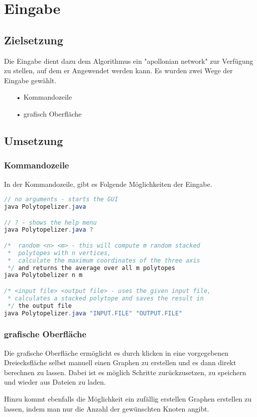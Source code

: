 \documentclass[11pt]{article}
\begin{document}
\section{Eingabe}
\subsection{Zielsetzung}
Die Eingabe dient dazu dem Algorithmus ein "apollonian network" zur Verfügung zu stellen, auf dem er Angewendet werden kann. Es wurden zwei Wege der Eingabe gewählt. 
\begin{itemize}
\item[•] Kommandozeile
\item[•] grafisch Oberfläche
\end{itemize}
\subsection{Umsetzung}
\subsubsection{Kommandozeile}
In der Kommandozeile, gibt es Folgende Möglichkeiten der Eingabe. 
\begin{lstlisting}[language=JAVA]
// no arguments - starts the GUI
java Polytopelizer.java

// ? - shows the help menu
java Polytopelizer.java ?

/*  random <n> <m> - this will compute m random stacked 
 *  polytopes with n vertices,
 *  calculate the maximum coordinates of the three axis 
 */ and returns the average over all m polytopes
java Polytobelizer n m

/* <input file> <output file> - uses the given input file,
 * calculates a stacked polytope and saves the result in 
 */ the output file
java Polytopelizer.java "INPUT.FILE" "OUTPUT.FILE"
\end{lstlisting}
\subsubsection{grafische Oberfläche}
Die grafische Oberfläche ermöglicht es durch klicken in eine vorgegebenen Dreiecksfläche selbst manuell einen Graphen zu erstellen und es dann direkt berechnen zu lassen. Dabei ist es möglich Schritte zurückzusetzen, zu speichern und wieder aus Dateien zu laden.

Hinzu kommt ebenfalls die Möglichkeit ein zufällig erstellen Graphen erstellen zu lassen, indem man nur die Anzahl der gewünschten Knoten angibt. 
\end{document}
